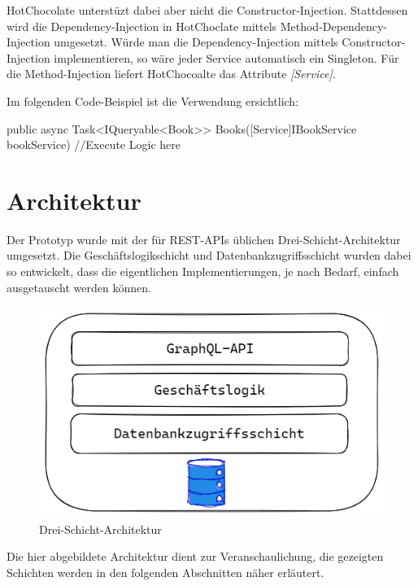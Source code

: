HotChocolate unterstüzt dabei aber nicht die Constructor-Injection.
Stattdessen wird die Dependency-Injection in HotChoclate mittels Method-Dependency-Injection umgesetzt.
Würde man die Dependency-Injection mittels Constructor-Injection implementieren, so wäre jeder Service automatisch ein Singleton.
Für die Method-Injection liefert HotChocoalte das Attribute \textit{[Service]}.

Im folgenden Code-Beispiel ist die Verwendung ersichtlich:
\begin{JsCode}
public async Task<IQueryable<Book>> Books([Service]IBookService bookService) {
    //Execute Logic here
}
\end{JsCode}

\section{Architektur}
Der Prototyp wurde mit der für REST-APIs üblichen Drei-Schicht-Architektur umgesetzt.
Die Geschäftslogikschicht und Datenbankzugriffsschicht wurden dabei so entwickelt, dass die eigentlichen Implementierungen, je nach Bedarf, einfach ausgetauscht werden können.
\newline

\begin{figure}[H]
    \includegraphics[width=\textwidth]{pics/architecture.png}
    \caption{Drei-Schicht-Architektur}
\end{figure}

Die hier abgebildete Architektur dient zur Veranschaulichung, die gezeigten Schichten werden in den folgenden Abschnitten näher erläutert.

